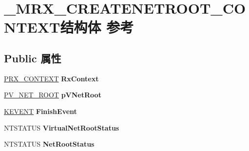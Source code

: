 \hypertarget{struct___m_r_x___c_r_e_a_t_e_n_e_t_r_o_o_t___c_o_n_t_e_x_t}{}\section{\+\_\+\+M\+R\+X\+\_\+\+C\+R\+E\+A\+T\+E\+N\+E\+T\+R\+O\+O\+T\+\_\+\+C\+O\+N\+T\+E\+X\+T结构体 参考}
\label{struct___m_r_x___c_r_e_a_t_e_n_e_t_r_o_o_t___c_o_n_t_e_x_t}
\subsection*{Public 属性}
\begin{DoxyCompactItemize}
\item 
\mbox{\label{struct___m_r_x___c_r_e_a_t_e_n_e_t_r_o_o_t___c_o_n_t_e_x_t_a6a36ae154ab90423e0c73ed6f4a35cf6}} 
\hyperlink{struct___r_x___c_o_n_t_e_x_t}{P\+R\+X\+\_\+\+C\+O\+N\+T\+E\+XT} {\bfseries Rx\+Context}
\item 
\mbox{\label{struct___m_r_x___c_r_e_a_t_e_n_e_t_r_o_o_t___c_o_n_t_e_x_t_a1c7aa19bfc6d85e9864ec5aacf599c9c}} 
\hyperlink{struct___v___n_e_t___r_o_o_t}{P\+V\+\_\+\+N\+E\+T\+\_\+\+R\+O\+OT} {\bfseries p\+V\+Net\+Root}
\item 
\mbox{\label{struct___m_r_x___c_r_e_a_t_e_n_e_t_r_o_o_t___c_o_n_t_e_x_t_a611bffb7a551347b45ef749fb3efe7a5}} 
\hyperlink{struct___k_e_v_e_n_t}{K\+E\+V\+E\+NT} {\bfseries Finish\+Event}
\item 
\mbox{\label{struct___m_r_x___c_r_e_a_t_e_n_e_t_r_o_o_t___c_o_n_t_e_x_t_a90af21c9302c14f84b68c1c0768c7471}} 
N\+T\+S\+T\+A\+T\+US {\bfseries Virtual\+Net\+Root\+Status}
\item 
\mbox{\label{struct___m_r_x___c_r_e_a_t_e_n_e_t_r_o_o_t___c_o_n_t_e_x_t_af190b2316d6cbf3f13f44421a1eb4655}} 
N\+T\+S\+T\+A\+T\+US {\bfseries Net\+Root\+Status}
\item 
\mbox{\label{struct___m_r_x___c_r_e_a_t_e_n_e_t_r_o_o_t___c_o_n_t_e_x_t_a983f0c17bdc8a40e6756c497ff023e0b}} 

\end{DoxyCompactItemize}
